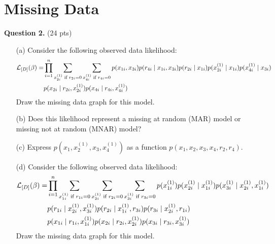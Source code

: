 \documentclass[11pt]{article}
\renewcommand{\vec}[1]{\mathbf{#1}}
\begin{document}
\section*{Missing Data}

{\bf Question 2.} (24 pts)

\begin{enumerate}
\item[(a)] Consider the following observed data likelihood:
{\small
\begin{align*}
{\cal L}_{[D]}(\vec{\beta}) =& \prod_{i=1}^n \sum_{x^{(1)}_{2i} \text{ if }r_{2i}=0} \sum_{x^{(1)}_{4i} \text{ if }r_{4i}=0}  p(x_{1i}, x_{3i}) p(r_{4i} \mid x_{1i}, x_{3i}) p(r_{2i} \mid x_{1i})
p(x^{(1)}_{2i} \mid x_{1i})
p(x^{(1)}_{4i} \mid x_{3i}) \\
& 
p(x_{2i} \mid r_{2i}, x^{(1)}_{2i})
p(x_{4i} \mid r_{4i}, x^{(1)}_{4i})
\end{align*}
}
Draw the missing data graph for this model.

\begin{answertext}{3cm}{}
    
\end{answertext}
\item[(b)] Does this likelihood represent a missing at random (MAR) model or missing not at random (MNAR) model?

\begin{answertext}{3cm}{}
    
\end{answertext}
\item[(c)] Express $p(x_1, x_2^{(1)}, x_3, x_4^{(1)})$ as a function $p(x_1, x_2, x_3, x_4, r_2, r_4)$.


\begin{answertext}{3cm}{}
    
\end{answertext}
\item[(d)] Consider the following observed data likelihood:
{\small
\begin{align*}
{\cal L}_{[D]}(\vec{\beta}) =&
\prod_{i=1}^n
\sum_{x^{(1)}_{1i} \text{ if }r_{1i}=0}
\sum_{x^{(1)}_{2i} \text{ if }r_{2i}=0}
\sum_{x^{(1)}_{3i} \text{ if }r_{3i}=0}
p(x^{(1)}_{1i}) p(x^{(1)}_{2i} \mid x^{(1)}_{1i})
p(x^{(1)}_{3i} \mid x^{(1)}_{2i}, x^{(1)}_{1i})\\
& 
p(r_{1i} \mid x^{(1)}_{2i}, x^{(1)}_{3i})
p(r_{2i} \mid x^{(1)}_{1i}, r_{3i})
p(r_{3i} \mid x^{(1)}_{2i}, r_{1i})
\\
&
p(x_{1i} \mid r_{1i}, x^{(1)}_{1i})
p(x_{2i} \mid r_{2i}, x^{(1)}_{2i})
p(x_{3i} \mid r_{3i}, x^{(1)}_{3i})
\end{align*}
}
Draw the missing data graph for this model.


\end{enumerate}
\end{document}
